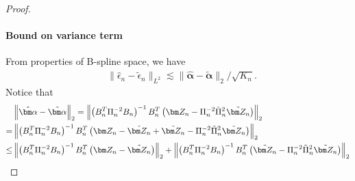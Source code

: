 \begin{proof}
\paragraph{Bound on variance term}
From properties of B-spline space, we have
\begin{equation*}
\begin{split}
&\|\hat\epsilon_n-\tilde\epsilon_n\|_{L^2}
\lesssim
\|\hat{\bm\alpha}-\tilde{\bm\alpha}\|_2/\sqrt{K_n}.
\end{split}
\end{equation*}
Notice that
\begin{align}
&\left\|\hat{\bm\alpha}-\tilde{\bm\alpha}\right\|_2
=\left\|\left(B_n^T\Pi_n^{-2}B_n\right)^{-1}B_n^T\left(\Zn-\Pi_n^{-2}\tilde\Pi_n^2\tilde\Zn\right)\right\|_2\nonumber
\\=&\left\|\left(B_n^T\Pi_n^{-2}B_n\right)^{-1}B_n^T\left(\Zn-\tilde\Zn+\tilde\Zn-\Pi_n^{-2}\tilde\Pi_n^2\tilde\Zn\right)\right\|_2\nonumber
\\\leq&\left\|\left(B_n^T\Pi_n^{-2}B_n\right)^{-1}B_n^T\left(\Zn-\tilde\Zn\right)\right\|_2
+\left\|\left(B_n^T\Pi_n^{-2}B_n\right)^{-1}B_n^T\left(\tilde\Zn-\Pi_n^{-2}\tilde\Pi_n^2\tilde\Zn\right)\right\|_2 \label{eq_appendix:variance}
\end{align}


\end{proof}
